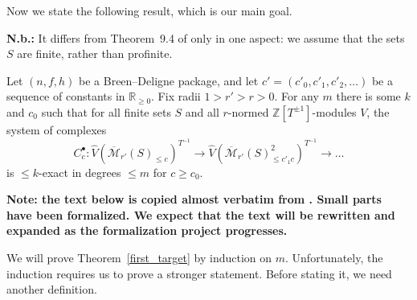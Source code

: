Now we state the following result, which is our main goal.

\textbf{N.b.:}
It differs from Theorem~9.4 of \cite{Analytic} only in one aspect:
we assume that the sets $S$ are finite, rather than profinite.

\begin{theorem}
  \label{first_target}
  \leanok
  Let $(n,f,h)$ be a Breen--Deligne package,
  and let $c' = (c'_0, c'_1, c'_2, \dots)$ be a sequence of constants in $\mathbb R_{\ge 0}$.
	Fix radii $1>r'>r>0$.
  For any $m$ there is some $k$ and $c_0$ such that for all finite sets $S$ and all $r$-normed $\mathbb Z[T^{\pm 1}]$-modules $V$,
  the system of complexes
  \[
    C_c^\bullet \colon
    \widehat{V}(\overline{\mathcal M}_{r'}(S)_{\leq c})^{T^{-1}} \to
    \widehat{V}(\overline{\mathcal M}_{r'}(S)_{\leq c'_1c}^2)^{T^{-1}}
    \to \ldots
  \]
  is $\leq k$-exact in degrees $\leq m$ for $c\geq c_0$.
\end{theorem}

\begin{remark}
  \label{boundary-text}
  \textbf{Note: the text below is copied almost verbatim from \cite{Analytic}.
  Small parts have been formalized.
  We expect that the text will be rewritten and expanded as the formalization project progresses.}
\end{remark}




We will prove Theorem~\ref{first_target} by induction on $m$.
Unfortunately, the induction requires us to prove a stronger statement.
Before stating it, we need another definition.

